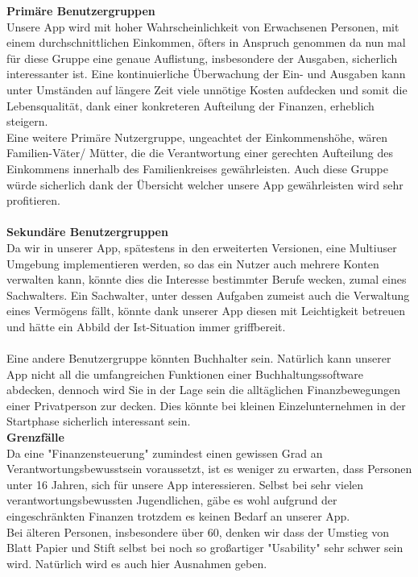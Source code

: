 \documentclass[runningheads,a4paper]{llncs}
\begin{document}
\textbullet \textbf{ Primäre Benutzergruppen}\\
Unsere App wird mit hoher Wahrscheinlichkeit von Erwachsenen Personen, mit einem durchschnittlichen Einkommen, öfters in Anspruch genommen da nun mal für diese Gruppe eine genaue Auflistung, insbesondere der Ausgaben,  sicherlich interessanter ist. Eine kontinuierliche Überwachung der Ein- und Ausgaben kann unter Umständen auf längere Zeit viele unnötige Kosten aufdecken und somit die Lebensqualität, dank einer konkreteren Aufteilung der Finanzen, erheblich steigern.\\
Eine weitere Primäre Nutzergruppe, ungeachtet der Einkommenshöhe, wären Familien-Väter/ Mütter, die die Verantwortung einer gerechten Aufteilung des Einkommens innerhalb des Familienkreises gewährleisten. Auch diese Gruppe würde sicherlich dank der Übersicht welcher unsere App gewährleisten wird sehr profitieren.\\\\

\textbullet\textbf{ Sekundäre Benutzergruppen}\\
Da wir in unserer App, spätestens in den erweiterten Versionen, eine Multiuser Umgebung implementieren werden, so das ein Nutzer auch mehrere Konten verwalten kann, könnte dies die  Interesse bestimmter Berufe wecken, zumal eines Sachwalters. Ein Sachwalter, unter dessen Aufgaben zumeist auch die Verwaltung eines Vermögens fällt, könnte dank unserer App diesen mit Leichtigkeit betreuen und hätte ein Abbild der Ist-Situation immer griffbereit. \\\\
Eine andere Benutzergruppe könnten Buchhalter sein. Natürlich kann unserer App nicht all die umfangreichen Funktionen einer Buchhaltungssoftware abdecken, dennoch wird Sie in der Lage sein die alltäglichen Finanzbewegungen einer Privatperson zur decken.  Dies könnte bei kleinen Einzelunternehmen in der Startphase sicherlich interessant sein. \\


\textbullet \textbf{ Grenzfälle}\\
Da eine "Finanzensteuerung" zumindest einen gewissen Grad an Verantwortungsbewusstsein voraussetzt, ist es weniger zu erwarten, dass Personen unter 16 Jahren, sich für unsere App interessieren. Selbst bei sehr vielen verantwortungsbewussten Jugendlichen, gäbe es wohl aufgrund der eingeschränkten Finanzen trotzdem es keinen Bedarf an unserer App. \\
Bei älteren Personen, insbesondere über 60, denken wir dass der Umstieg von Blatt Papier und Stift selbst bei noch so großartiger "Usability" sehr schwer sein wird. Natürlich wird es auch hier Ausnahmen geben.  
\end{document}
